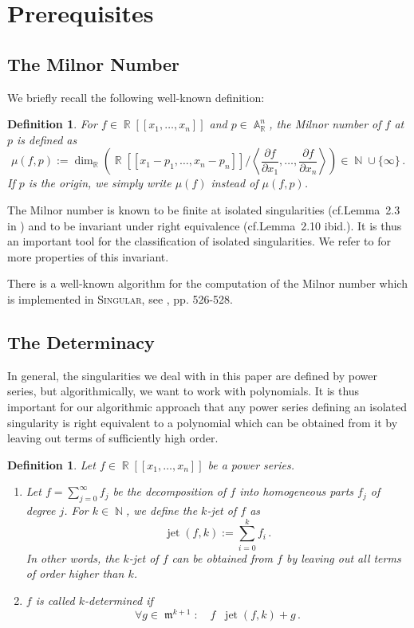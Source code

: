 \documentclass[noend]{amsproc}
\newtheorem{defn}[theorem]{Definition}
\theoremstyle{definition}
\newcommand{\Singular}{\textsc{Singular}}
\DeclareMathOperator{\requiv}{\overset{r}{\sim}}
\DeclareMathOperator{\m}{\mathfrak{m}}
\DeclareMathOperator{\jet}{jet}
\DeclareMathOperator{\N}{\mathbb{N}}
\DeclareMathOperator{\R}{\mathbb{R}}
\DeclareMathOperator{\A}{\mathbb{A}}
\begin{document}
\section{Prerequisites}%
\label{sec:prerequisites}

\subsection{The Milnor Number}%
\label{subsec:milnor_number}

We briefly recall the following well-known definition:

\begin{defn}
For $f \in \R[[x_1,\ldots,x_n]]$ and $p \in \A_{\R}^n$, the
\emph{Milnor number} of $f$ at $p$ is defined as
\[
\mu(f, p) := \dim_{\R}
\left( \R[[x_1-p_1, \ldots, x_n-p_n]] \bigg/
\left\langle \frac{\partial f}{\partial x_1}, \ldots,
\frac{\partial f}{\partial x_n} \right\rangle \right)
\in \N \cup \{\infty\} \,.
\]
If $p$ is the origin, we simply write $\mu(f)$ instead of $\mu(f, p)$.
\end{defn}

The Milnor number is known to be finite at isolated singularities
(cf.\@ Lemma~2.3 in \cite{GLS2007}) and to be invariant under right equivalence
(cf.\@ Lemma~2.10 ibid.). It is thus an important tool for the classification
of isolated singularities. We refer to \cite{GLS2007} for more properties of
this invariant.

There is a well-known algorithm for the computation of the Milnor number which
is implemented in \Singular{}, see \cite{GP2008}, pp. 526-528.


\subsection{The Determinacy}%
\label{subsec:determinacy}

In general, the singularities we deal with in this paper are defined by power
series, but algorithmically, we want to work with polynomials. It is thus
important for our algorithmic approach that any power series defining an
isolated singularity is right equivalent to a polynomial which can be obtained
from it by leaving out terms of sufficiently high order.

\begin{defn}
Let $f \in \R[[x_1,\ldots,x_n]]$ be a power series.

\begin{enumerate}
\item Let $f = \sum_{j=0}^\infty f_j$ be the decomposition of $f$ into
homogeneous parts $f_j$ of degree $j$.
For $k \in \N$, we define the \emph{$k$-jet} of $f$ as
\[
\jet(f,k) := \sum_{i=0}^k f_i \,.
\]
In other words, the $k$-jet of $f$ can be obtained from $f$ by leaving out all
terms of order higher than $k$.

\item $f$ is called \emph{$k$-determined} if
\[
\forall g \in \m^{k+1}: \quad f \requiv \jet(f,k)+g \,.
\]
\end{enumerate}
\end{defn}
\end{document}
